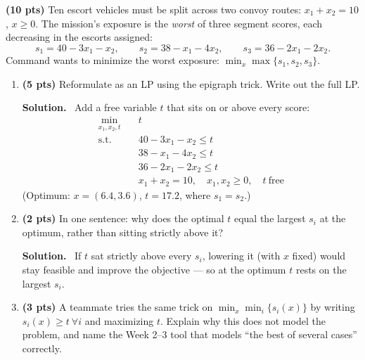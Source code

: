 \documentclass[10pt]{article}
\newenvironment{solution}
  {\par\smallskip\begingroup\color{solink}\textbf{Solution.}\ }
  {\endgroup\par}
\begin{document}
\begin{parts}
\item \textbf{(10 pts)} Ten escort vehicles must be split across two convoy routes:
  $x_1 + x_2 = 10$, $x \ge 0$. The mission's exposure is the \emph{worst} of three
  segment scores, each decreasing in the escorts assigned:
  \[
    s_1 = 40 - 3x_1 - x_2, \qquad
    s_2 = 38 - x_1 - 4x_2, \qquad
    s_3 = 36 - 2x_1 - 2x_2 .
  \]
  Command wants to minimize the worst exposure:
  $\min_{x} \max\{s_1, s_2, s_3\}$.
  \begin{enumerate}[label=(\roman*), leftmargin=2.2em, itemsep=2pt]
    \item \textbf{(5 pts)} Reformulate as an LP using the epigraph trick. Write out
      the full LP.

\begin{solution}
Add a free variable $t$ that sits on or above every score:
\[
\begin{aligned}
  \min_{x_1, x_2, t}\quad & t \\
  \text{s.t.}\quad & 40 - 3x_1 - x_2 \le t \\
                   & 38 - x_1 - 4x_2 \le t \\
                   & 36 - 2x_1 - 2x_2 \le t \\
                   & x_1 + x_2 = 10, \quad x_1, x_2 \ge 0, \quad t \ \text{free}
\end{aligned}
\]
(Optimum: $x = (6.4, 3.6)$, $t = 17.2$, where $s_1 = s_2$.)
\end{solution}

    \item \textbf{(2 pts)} In one sentence: why does the optimal $t$ equal the
      largest $s_i$ at the optimum, rather than sitting strictly above it?

\begin{solution}
If $t$ sat strictly above every $s_i$, lowering it (with $x$ fixed) would stay
feasible and improve the objective --- so at the optimum $t$ rests on the largest
$s_i$.
\end{solution}

    \item \textbf{(3 pts)} A teammate tries the same trick on
      $\min_x \min_i \{s_i(x)\}$ by writing $s_i(x) \ge t \ \forall i$ and
      maximizing $t$. Explain why this does not model the problem, and name the
      Week 2--3 tool that models ``the best of several cases'' correctly.


\end{enumerate}
\end{parts}
\end{document}

